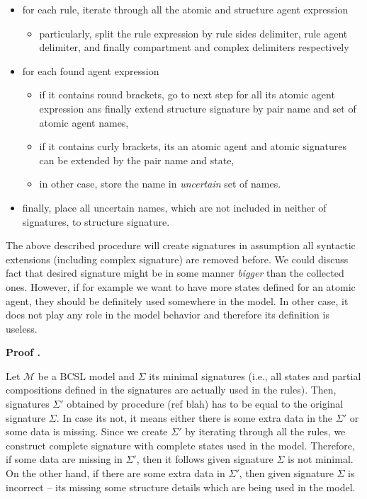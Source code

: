 \documentclass[12pt]{fithesis2}
\newcounter{counter}[section]
\renewcommand{\thecounter}{\thesection.\arabic{counter}}
\newenvironment{proof}{\bigskip\refstepcounter{counter}\noindent\textbf{Proof \thecounter}\par\nopagebreak}{\bigskip}
\begin{document}
\begin{itemize}
\item for each rule, iterate through all the atomic and structure agent expression 
\begin{itemize}
  \item particularly, split the rule expression by rule sides delimiter, rule agent delimiter, and finally compartment and complex delimiters respectively
\end{itemize}
\item for each found agent expression
\begin{itemize}
  \item if it contains round brackets, go to next step for all its atomic agent expression ans finally extend structure signature by pair name and set of atomic agent names,
  \item if it contains curly brackets, its an atomic agent and atomic signatures can be extended by the pair name and state,
  \item in other case, store the name in \emph{uncertain} set of names.
\end{itemize}
\item finally, place all uncertain names, which are not included in neither of signatures, to structure signature.
\end{itemize}

The above described procedure will create signatures in assumption all syntactic extensions (including complex signature) are removed before. We could discuss fact that desired signature might be in some manner \emph{bigger} than the collected ones. However, if for example we want to have more states defined for an atomic agent, they should be definitely used somewhere in the model. In other case, it does not play any role in the model behavior and therefore its definition is useless. 

\begin{proof}
Let $\mathcal{M}$ be a BCSL model and $\Sigma$ its minimal signatures (i.e., all states and partial compositions defined in the signatures are actually used in the rules). Then, signatures $\Sigma'$ obtained by procedure (ref blah) has to be equal to the original signature $\Sigma$. In case its not, it means either there is some extra data in the $\Sigma'$ or some data is missing. Since we create $\Sigma'$ by iterating through all the rules, we construct complete signature with complete states used in the model. Therefore, if some data are missing in $\Sigma'$, then it follows given signature $\Sigma$ is not minimal. On the other hand, if there are some extra data in $\Sigma'$, then given signature $\Sigma$ is incorrect -- its missing some structure details which are being used in the model.
\end{proof}
\end{document}
